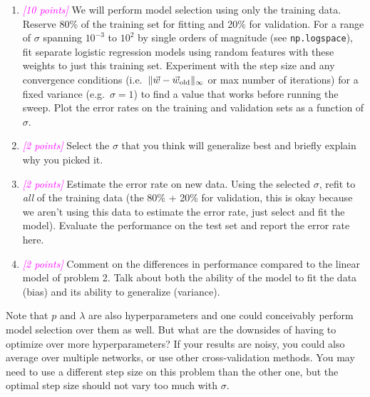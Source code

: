 \documentclass{article}
\newcommand{\points}[1]{\small\textcolor{magenta}{\emph{[#1 points]}} \normalsize}
\begin{document}
\begin{enumerate}
\item \points{10} We will perform model selection using only the training data.
  Reserve 80\% of the training set for fitting and 20\% for validation.
  For a range of $\sigma$ spanning $10^{-3}$ to $10^2$ by single orders of magnitude
  (see {\tt np.logspace}),
  fit separate logistic regression models using random features with these weights
  to just this training set. 
  Experiment with the step size and any convergence conditions
  (i.e.\ $\|\vec w - \vec w_{\rm old} \|_\infty$ or max number of iterations)
  for a fixed variance (e.g.\ $\sigma = 1$) 
  to find a value that works before running the sweep.
  Plot the error rates on the training and validation sets as a function of $\sigma$.
\item \points{2} Select the $\sigma$ that you think will generalize best and
  briefly explain why you picked it.
\item \points{2} Estimate the error rate on new data.
  Using the selected $\sigma$, refit to {\em all} of the training data
  (the 80\% + 20\% for validation, this is okay because we aren't using this 
  data to estimate the error rate, just select and fit the model).
  Evaluate the performance on the test set and report the error rate here.
\item \points{2} Comment on the differences in performance compared to the linear model
  of problem 2. 
  Talk about both the ability of the model to fit the data (bias)
  and its ability to generalize (variance).
\end{enumerate}
Note that $p$ and $\lambda$ are also hyperparameters
and one could conceivably perform model selection over them as well.
But what are the downsides of having to optimize over more hyperparameters?
If your results are noisy, you could also average over multiple networks,
or use other cross-validation methods.
You may need to use a different step size on this problem than the other one,
but the optimal step size should not vary too much with $\sigma$.
\end{document}
